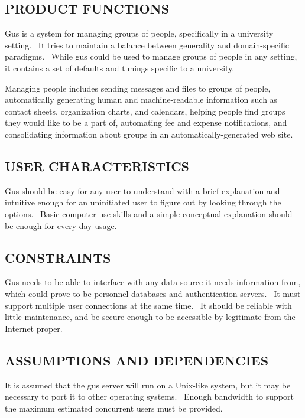 \documentclass[letterpaper]{article}
\newcommand\textstyleDefaultParagraphFont[1]{#1}
\begin{document}
\subsection[PRODUCT FUNCTIONS]{\rmfamily PRODUCT FUNCTIONS}

\bigskip

{\color{black}
Gus is a system for managing groups of people, specifically in a
university setting. \ It tries to maintain a balance between generality
and domain-specific paradigms. \ While gus could be used to manage
groups of people in any setting, it contains a set of defaults and
tunings specific to a university.}

{\color{black}
Managing people includes sending messages and files to groups of people,
automatically generating human and machine-readable information such as
contact sheets, organization charts, and calendars, helping people find
groups they would like to be a part of, automating fee and expense
notifications, and consolidating information about groups in an
automatically-generated web site.}


\bigskip

\subsection[USER CHARACTERISTICS]{\textstyleDefaultParagraphFont{USER
CHARACTERISTICS}}

\bigskip

{\color{black}
Gus should be easy for any user to understand with a brief explanation
and intuitive enough for an uninitiated user to figure out by looking
through the options. \ Basic computer use skills and a simple
conceptual explanation should be enough for every day usage.}

\subsection[CONSTRAINTS]{\rmfamily CONSTRAINTS}

\bigskip

{\color{black}
Gus needs to be able to interface with any data source it needs
information from, which could prove to be personnel databases and
authentication servers. \ It must support multiple user connections at
the same time. \ It should be reliable with little maintenance, and be
secure enough to be accessible by legitimate from the Internet proper.}

\subsection[ASSUMPTIONS AND DEPENDENCIES]{\rmfamily ASSUMPTIONS AND
DEPENDENCIES}
{\color{black}
It is assumed that the gus server will run on a Unix-like system, but it
may be necessary to port it to other operating systems. \ Enough
bandwidth to support the maximum estimated concurrent users must be
provided.}
\end{document}
